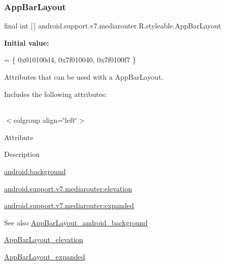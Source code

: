 \subsubsection{\texorpdfstring{App\+Bar\+Layout}{AppBarLayout}}
{\footnotesize\ttfamily final int \mbox{[}$\,$\mbox{]} android.\+support.\+v7.\+mediarouter.\+R.\+styleable.\+App\+Bar\+Layout\hspace{0.3cm}{\ttfamily [static]}}

{\bfseries Initial value\+:}
\begin{DoxyCode}
= \{
            0x010100d4, 0x7f010040, 0x7f0100f7
        \}
\end{DoxyCode}
Attributes that can be used with a App\+Bar\+Layout. 

Includes the following attributes\+:

\tabulinesep=1mm
\begin{longtabu} spread 0pt [c]{*{0}{|X[-1]}|}
\hline
\end{longtabu}
$<$colgroup align=\char`\"{}left\char`\"{}$>$ 

Attribute

Description 

{\ttfamily \hyperlink{classandroid_1_1support_1_1v7_1_1mediarouter_1_1R_1_1styleable_a60f0ed09c40470debb8059fff6b0777c}{android\+:background}}

{\ttfamily \hyperlink{classandroid_1_1support_1_1v7_1_1mediarouter_1_1R_1_1styleable_a94fe1d4c732eab96a6a39f87b5e7033d}{android.\+support.\+v7.\+mediarouter\+:elevation}}

{\ttfamily \hyperlink{classandroid_1_1support_1_1v7_1_1mediarouter_1_1R_1_1styleable_a7af4ef569f9c7c7a9c4ee947088887d0}{android.\+support.\+v7.\+mediarouter\+:expanded}}

\begin{DoxySeeAlso}{See also}
\hyperlink{classandroid_1_1support_1_1v7_1_1mediarouter_1_1R_1_1styleable_a60f0ed09c40470debb8059fff6b0777c}{App\+Bar\+Layout\+\_\+android\+\_\+background} 

\hyperlink{classandroid_1_1support_1_1v7_1_1mediarouter_1_1R_1_1styleable_a94fe1d4c732eab96a6a39f87b5e7033d}{App\+Bar\+Layout\+\_\+elevation} 

\hyperlink{classandroid_1_1support_1_1v7_1_1mediarouter_1_1R_1_1styleable_a7af4ef569f9c7c7a9c4ee947088887d0}{App\+Bar\+Layout\+\_\+expanded} 
\end{DoxySeeAlso}
\mbox{\label{classandroid_1_1support_1_1v7_1_1mediarouter_1_1R_1_1styleable_a60f0ed09c40470debb8059fff6b0777c}} 
